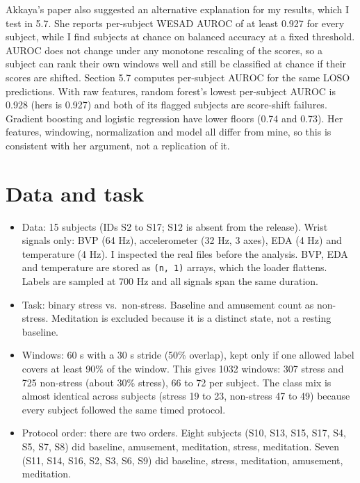 \documentclass[11pt]{article}
\providecommand{\tightlist}{\setlength{\itemsep}{2pt}\setlength{\parskip}{0pt}}
\begin{document}
Akkaya's paper also suggested an alternative explanation for my results,
which I test in 5.7. She reports per-subject WESAD AUROC of at least
0.927 for every subject, while I find subjects at chance on balanced
accuracy at a fixed threshold. AUROC does not change under any monotone
rescaling of the scores, so a subject can rank their own windows well
and still be classified at chance if their scores are shifted. Section
5.7 computes per-subject AUROC for the same LOSO predictions. With raw
features, random forest's lowest per-subject AUROC is 0.928 (hers is
0.927) and both of its flagged subjects are score-shift failures.
Gradient boosting and logistic regression have lower floors (0.74 and
0.73). Her features, windowing, normalization and model all differ from
mine, so this is consistent with her argument, not a replication of it.

\hypertarget{data-and-task}{%
\section{Data and task}\label{data-and-task}}

\begin{itemize}
\tightlist
\item
  Data: 15 subjects (IDs S2 to S17; S12 is absent from the release).
  Wrist signals only: BVP (64 Hz), accelerometer (32 Hz, 3 axes), EDA (4
  Hz) and temperature (4 Hz). I inspected the real files before the
  analysis. BVP, EDA and temperature are stored as \texttt{(n,\ 1)}
  arrays, which the loader flattens. Labels are sampled at 700 Hz and
  all signals span the same duration.
\item
  Task: binary stress vs.~non-stress. Baseline and amusement count as
  non-stress. Meditation is excluded because it is a distinct state, not
  a resting baseline.
\item
  Windows: 60 s with a 30 s stride (50\% overlap), kept only if one
  allowed label covers at least 90\% of the window. This gives 1032
  windows: 307 stress and 725 non-stress (about 30\% stress), 66 to 72
  per subject. The class mix is almost identical across subjects (stress
  19 to 23, non-stress 47 to 49) because every subject followed the same
  timed protocol.
\item
  Protocol order: there are two orders. Eight subjects (S10, S13, S15,
  S17, S4, S5, S7, S8) did baseline, amusement, meditation, stress,
  meditation. Seven (S11, S14, S16, S2, S3, S6, S9) did baseline,
  stress, meditation, amusement, meditation.
\end{itemize}
\end{document}
